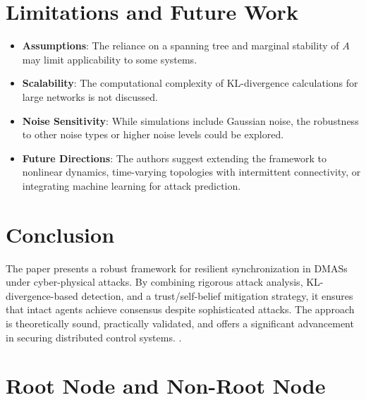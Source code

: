 \documentclass{article}
\begin{document}
\section*{Limitations and Future Work}
\begin{itemize}
    \item \textbf{Assumptions}: The reliance on a spanning tree and marginal stability of $A$ may limit applicability to some systems.
    \item \textbf{Scalability}: The computational complexity of KL-divergence calculations for large networks is not discussed.
    \item \textbf{Noise Sensitivity}: While simulations include Gaussian noise, the robustness to other noise types or higher noise levels could be explored.
    \item \textbf{Future Directions}: The authors suggest extending the framework to nonlinear dynamics, time-varying topologies with intermittent connectivity, or integrating machine learning for attack prediction.
\end{itemize}

\section*{Conclusion}
The paper presents a robust framework for resilient synchronization in DMASs under cyber-physical attacks. By combining rigorous attack analysis, KL-divergence-based detection, and a trust/self-belief mitigation strategy, it ensures that intact agents achieve consensus despite sophisticated attacks. The approach is theoretically sound, practically validated, and offers a significant advancement in securing distributed control systems.
.




\section{Root Node and Non-Root Node}
\end{document}
